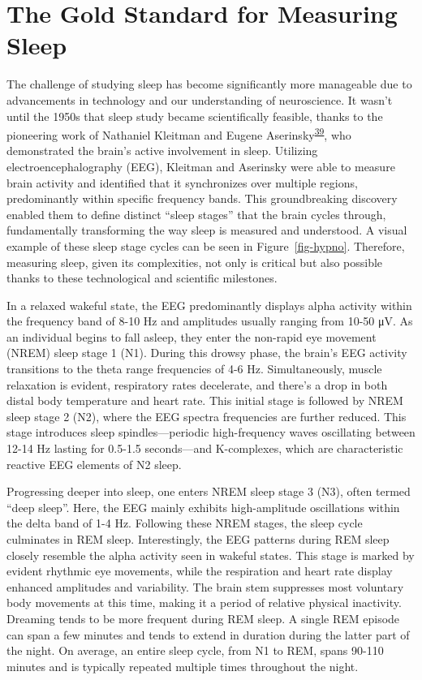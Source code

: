 \documentclass[
  10pt,
]{scrbook}
\begin{document}
\hypertarget{the-gold-standard-for-measuring-sleep}{%
\section{The Gold Standard for Measuring
Sleep}\label{the-gold-standard-for-measuring-sleep}}

The challenge of studying sleep has become significantly more manageable
due to advancements in technology and our understanding of neuroscience.
It wasn't until the 1950s that sleep study became scientifically
feasible, thanks to the pioneering work of Nathaniel Kleitman and Eugene
Aserinsky\textsuperscript{\protect\hyperlink{ref-aserinsky_1953}{39}},
who demonstrated the brain's active involvement in sleep. Utilizing
electroencephalography (EEG), Kleitman and Aserinsky were able to
measure brain activity and identified that it synchronizes over multiple
regions, predominantly within specific frequency bands. This
groundbreaking discovery enabled them to define distinct ``sleep
stages'' that the brain cycles through, fundamentally transforming the
way sleep is measured and understood. A visual example of these sleep
stage cycles can be seen in Figure~\ref{fig-hypno}. Therefore, measuring
sleep, given its complexities, not only is critical but also possible
thanks to these technological and scientific milestones.

In a relaxed wakeful state, the EEG predominantly displays alpha
activity within the frequency band of 8-10 Hz and amplitudes usually
ranging from 10-50 μV. As an individual begins to fall asleep, they
enter the non-rapid eye movement (NREM) sleep stage 1 (N1). During this
drowsy phase, the brain's EEG activity transitions to the theta range
frequencies of 4-6 Hz. Simultaneously, muscle relaxation is evident,
respiratory rates decelerate, and there's a drop in both distal body
temperature and heart rate. This initial stage is followed by NREM sleep
stage 2 (N2), where the EEG spectra frequencies are further reduced.
This stage introduces sleep spindles---periodic high-frequency waves
oscillating between 12-14 Hz lasting for 0.5-1.5 seconds---and
K-complexes, which are characteristic reactive EEG elements of N2 sleep.

Progressing deeper into sleep, one enters NREM sleep stage 3 (N3), often
termed ``deep sleep''. Here, the EEG mainly exhibits high-amplitude
oscillations within the delta band of 1-4 Hz. Following these NREM
stages, the sleep cycle culminates in REM sleep. Interestingly, the EEG
patterns during REM sleep closely resemble the alpha activity seen in
wakeful states. This stage is marked by evident rhythmic eye movements,
while the respiration and heart rate display enhanced amplitudes and
variability. The brain stem suppresses most voluntary body movements at
this time, making it a period of relative physical inactivity. Dreaming
tends to be more frequent during REM sleep. A single REM episode can
span a few minutes and tends to extend in duration during the latter
part of the night. On average, an entire sleep cycle, from N1 to REM,
spans 90-110 minutes and is typically repeated multiple times throughout
the night.
\end{document}
